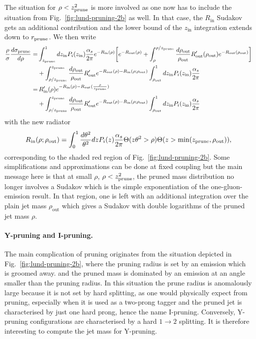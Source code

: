The situation for $\rho<z_{\text{prune}}^2$ is more involved as one now has to
include the situation from Fig.~\ref{fig:lund-pruning-2b} as well. In
that case, the $R_\text{in}$ Sudakov gets an additional contribution
and the lower bound of the $z_\text{in}$ integration extends down to
$r_{\text{prune}}$. We then write
%
\begin{align}\label{eq:pruning-smallrho-int}
  \frac{\rho}{\sigma}\frac{d\sigma_{\text{prune}}}{d\rho}
   = &\int_{z_{\text{prune}}}^1 dz_\text{in} P_i(z_\text{in})
    \frac{\alpha_s}{2\pi} e^{-R_\text{in}(\rho)}
    \bigg[
    e^{-R_\text{out}(\rho)}
    +\int_\rho^{\rho/z_{\text{prune}}}\frac{d\rho_\text{out}}{\rho_\text{out}}R'_\text{out}(\rho_\text{out})
    e^{-R_\text{out}(\rho_\text{out})}
    \bigg]\nonumber\\
  & + \int_{\rho/z_{\text{prune}}}^{z_{\text{prune}}}\frac{d\rho_\text{out}}{\rho_\text{out}}R'_\text{out}
    e^{-R_\text{out}(\rho)-R_\text{in}(\rho;\rho_\text{out})}
    \int_{\rho_\text{out}}^1 dz_\text{in} P_i(z_\text{in})
    \frac{\alpha_s}{2\pi} \nonumber \\
 =   & \, R'_\text{in}(\rho) e^{-R_\text{in}(\rho)-R_\text{out}(\frac{\rho}{z_{\text{prune}}})} 
  \nonumber \\
 &+ \int_{\rho/z_{\text{prune}}}^{z_{\text{prune}}}\frac{d\rho_\text{out}}{\rho_\text{out}}R'_\text{out}
    e^{-R_\text{out}(\rho)-R_\text{in}(\rho;\rho_\text{out})}
    \int_{\rho_\text{out}}^1 dz_\text{in} P_i(z_\text{in})
    \frac{\alpha_s}{2\pi}
\end{align}
with the new radiator
\begin{equation}
  R_\text{in}(\rho;\rho_\text{out})
  = \int_0^1 \frac{d\theta^2}{\theta^2}dz  P_i(z)\frac{\alpha_s}{2\pi}
  \Theta(z\theta^2>\rho) \Theta(z>{\text{min}}(z_{\text{prune}},\rho_\text{out})),
\end{equation}
corresponding to the shaded red region of
Fig.~\ref{fig:lund-pruning-2b}.
%
Some simplifications and approximations can be done at fixed coupling
but the main message here is that at small $\rho$, $\rho<z_{\text{prune}}^2$,
the pruned mass distribution no longer involves a Sudakov which is the
simple exponentiation of the one-gluon-emission result. In that
region, one is left with an additional integration over the plain jet
mass $\rho_\text{out}$ which gives a Sudakov with double logarithms of
the pruned jet mass $\rho$.

\paragraph{Y-pruning and I-pruning.} The main complication of
pruning originates from the situation depicted in Fig.~\ref{fig:lund-pruning-2b},
where the pruning radius is set by an emission which is groomed away. 
and the pruned mass is dominated by an emission at an angle smaller
than the pruning radius. 
In this situation the prune radius is anomalously large because it is not set by hard splitting, as one would physically expect from pruning, especially when it is used as a two-prong tagger and the pruned jet is characterised by just one hard prong, hence the name I-pruning. 
Conversely, Y-pruning configurations are characterised by a hard $1\to 2$ splitting. 
It is therefore interesting to compute the jet mass for Y-pruning.

